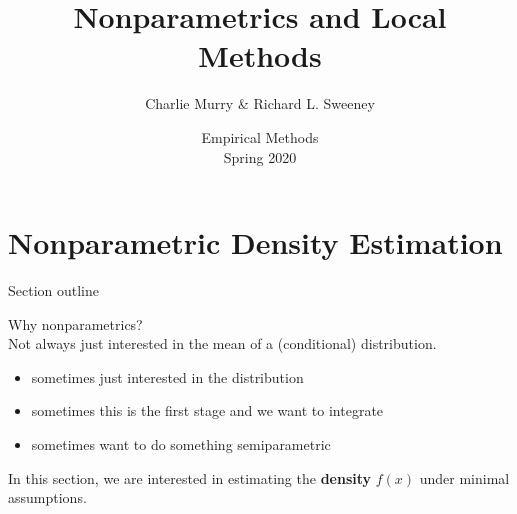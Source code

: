 

\setlength{\parskip}{5pt} 

\usepackage{comment}

\title [Non-parametrics]{Nonparametrics and Local Methods}
\author{Charlie Murry \& Richard L. Sweeney}
\date{Empirical Methods \\ Spring 2020}






\begin{frame}
\titlepage
\end{frame}

\begin{frame}
  \tableofcontents  
\end{frame}

\section[Density Estimation]{Nonparametric Density Estimation}

\begin{frame}{Section outline}

Why nonparametrics?\\[1em]

Not always just interested in the mean of a (conditional) distribution. 

\begin{itemize}
  \item sometimes just interested in the distribution %
  \item sometimes this is the first stage and we want to integrate
  \item sometimes want to do something semiparametric 
\end{itemize}

In this section, we are interested in estimating the \textbf{density} $f(x)$ under minimal assumptions. 

\end{frame}




